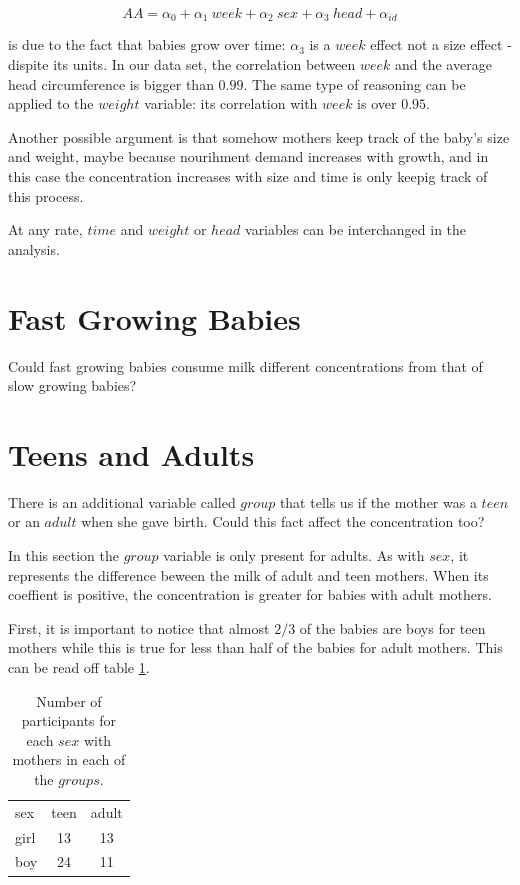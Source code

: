 \documentclass[12pt]{article}
\begin{document}
\begin{equation*}
  AA = \alpha_0 + \alpha_1 \ week + \alpha_2 \ sex + \alpha_3 \ head + \alpha_{id}
\end{equation*}

is due to the fact that babies grow over time: $\alpha_3$ is a $week$ effect not a size effect - dispite its units. In our data set, the correlation between $week$ and the average head circumference is bigger than $0.99$. The same type of reasoning can be applied to the $weight$ variable: its correlation with $week$ is over $0.95$.

Another possible argument is that somehow mothers keep track of the baby's size and weight, maybe because nourihment demand increases with growth, and in this case the concentration increases with size and time is only keepig track of this process.

At any rate, $time$ and $weight$ or $head$ variables can be interchanged in the analysis.

\section{Fast Growing Babies}

Could fast growing babies consume milk different concentrations from that of slow growing babies? 

\section{Teens and Adults}

There is an additional variable called $group$ that tells us if the mother was a $teen$ or an $adult$ when she gave birth. Could this fact affect the concentration too?

In this section the $group$ variable is only present for adults. As with $sex$, it represents the difference beween the milk of adult and teen mothers. When its coeffient is positive, the concentration is greater for babies with adult mothers.

First, it is important to notice that almost $2/3$ of the babies are boys for teen mothers while this is true for less than half of the babies for adult mothers. This can be read off table \ref{tab:sexgroup}.

\begin{table}[H]
  \centering
  \begin{tabular}{lcc}
    sex & teen & adult \\
    girl & 13 & 13  \\
    boy & 24 & 11
  \end{tabular}
  \caption{Number of participants for each $sex$ with mothers in each of the $groups$.}
  \label{tab:sexgroup}
\end{table}
\end{document}
